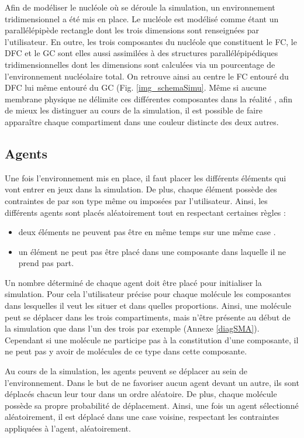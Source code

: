 Afin de modéliser le nucléole où se déroule la simulation, un
environnement tridimensionnel a été mis en place. Le nucléole est
modélisé comme étant un parallélépipède rectangle dont les trois
dimensions sont renseignées par l'utilisateur. En outre, les trois
composantes du nucléole que constituent le FC, le DFC et le GC sont
elles aussi assimilées à des structures parallélépipédiques
tridimensionnelles dont les dimensions sont calculées via un
pourcentage de l'environnement nucléolaire total. On retrouve ainsi au
centre le FC entouré du DFC lui même entouré du GC
(Fig. \ref{img_schemaSimu}. Même si aucune membrane physique ne
délimite ces différentes composantes dans la \og{} réalité \fg{}, afin
de mieux les distinguer au cours de la simulation, il est possible de
faire apparaître chaque compartiment dans une couleur distincte des
deux autres.

\subsection{Agents}

Une fois l'environnement mis en place, il faut placer les différents
éléments qui vont entrer en jeux dans la simulation. De plus, chaque
élément possède des contraintes de par son type même ou imposées par
l'utilisateur. Ainsi, les différents agents sont placés aléatoirement
tout en respectant certaines règles :

\begin{itemize}
	\item deux éléments ne peuvent pas être en même temps sur une même
  \og{} case \fg{}.
	\item un élément ne peut pas être placé dans une composante dans
      laquelle il ne prend pas part.
\end{itemize}

Un nombre déterminé de chaque agent doit être placé pour initialiser
la simulation. Pour cela l'utilisateur précise pour chaque molécule
les composantes dans lesquelles il veut les situer et dans quelles
proportions. Ainsi, une molécule peut se déplacer dans les trois
compartiments, mais n'être présente au début de la simulation que dans
l'un des trois par exemple (Annexe \ref{diagSMA}). Cependant si une
molécule ne participe pas à la constitution d'une composante, il ne
peut pas y avoir de molécules de ce type dans cette composante.

Au cours de la simulation, les agents peuvent se déplacer au sein de
l'environnement. Dans le but de ne favoriser aucun agent devant un
autre, ils sont déplacés chacun leur tour dans un ordre aléatoire. De
plus, chaque molécule possède sa propre probabilité de
déplacement. Ainsi, une fois un agent sélectionné aléatoirement, il
est déplacé dans une case voisine, respectant les contraintes
appliquées à l'agent, aléatoirement.

